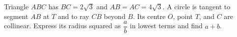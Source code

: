 Triangle $ABC$ has $BC=2\sqrt3$ and $AB=AC=4\sqrt3$. A circle is tangent to segment $AB$ at $T$ and to ray $CB$ beyond $B$. Its centre $O$, point $T$, and $C$ are collinear. Express its radius squared as $\dfrac{a}{b}$ in lowest terms and find $a+b$.

